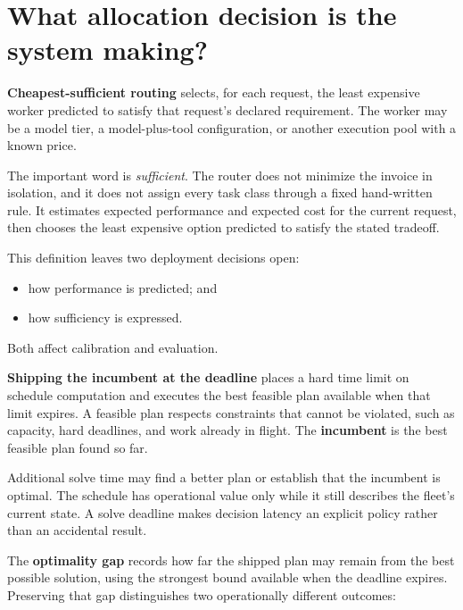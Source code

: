 \hypertarget{what-allocation-decision-is-the-system-making}{%
\section{What allocation decision is the system making?}\label{what-allocation-decision-is-the-system-making}}

\textbf{Cheapest-sufficient routing} selects, for each request, the least expensive worker predicted to satisfy that request's declared requirement. The worker may be a model tier, a model-plus-tool configuration, or another execution pool with a known price.

The important word is \emph{sufficient}. The router does not minimize the invoice in isolation, and it does not assign every task class through a fixed hand-written rule. It estimates expected performance and expected cost for the current request, then chooses the least expensive option predicted to satisfy the stated tradeoff.


This definition leaves two deployment decisions open:

\begin{itemize}
\tightlist
\item
  how performance is predicted; and
\item
  how sufficiency is expressed.
\end{itemize}

Both affect calibration and evaluation.

\textbf{Shipping the incumbent at the deadline} places a hard time limit on schedule computation and executes the best feasible plan available when that limit expires. A feasible plan respects constraints that cannot be violated, such as capacity, hard deadlines, and work already in flight. The \textbf{incumbent} is the best feasible plan found so far.

Additional solve time may find a better plan or establish that the incumbent is optimal. The schedule has operational value only while it still describes the fleet's current state. A solve deadline makes decision latency an explicit policy rather than an accidental result.


The \textbf{optimality gap} records how far the shipped plan may remain from the best possible solution, using the strongest bound available when the deadline expires. Preserving that gap distinguishes two operationally different outcomes:

